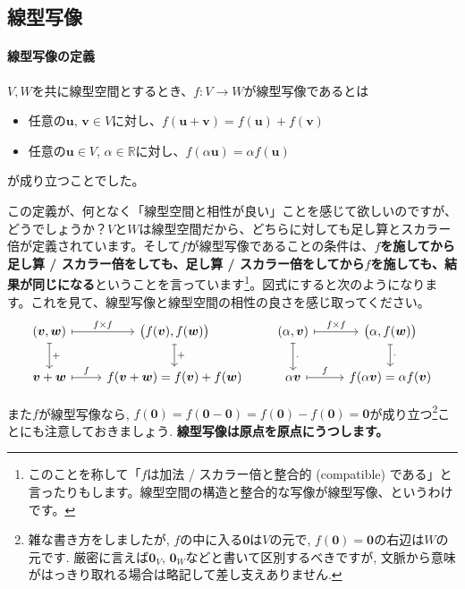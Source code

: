 \subsection{線型写像}

\paragraph{線型写像の定義}

$V, W$を共に線型空間とするとき、$f\colon V\rightarrow W$が線型写像であるとは
\begin{itemize}
\item 任意の$\bm{u}$, $\bm{v}\in V$に対し、$f(\bm{u} + \bm{v}) = f(\bm{u}) + f(\bm{v})$
\item 任意の$\bm{u}\in V$, $\alpha\in\mathbb{R}$に対し、$f(\alpha\bm{u}) = \alpha f(\bm{u})$
\end{itemize}
が成り立つことでした。

この定義が、何となく「線型空間と相性が良い」ことを感じて欲しいのですが、どうでしょうか？$V$と$W$は線型空間だから、どちらに対しても足し算とスカラー倍が定義されています。そして$f$が線型写像であることの条件は、\textbf{$f$を施してから足し算 / スカラー倍をしても、足し算 / スカラー倍をしてから$f$を施しても、結果が同じになる}ということを言っています\footnote{このことを称して「$f$は加法 / スカラー倍と整合的 (compatible) である」と言ったりもします。線型空間の構造と整合的な写像が線型写像、というわけです。}。図式にすると次のようになります。これを見て、線型写像と線型空間の相性の良さを感じ取ってください。
\[
\begin{tikzcd}
(\bm{v},\bm{w}) \arrow[mapsto]{r}{f\times f}  \arrow[mapsto]{d}{+} & \bigl(f(\bm{v}),f(\bm{w})\bigr) \arrow[mapsto]{d}{+} \\
\bm{v}+\bm{w} \arrow[mapsto]{r}{f} & f(\bm{v}+\bm{w})=f(\bm{v})+f(\bm{w})
\end{tikzcd}
\qquad
\begin{tikzcd}
(\alpha,\bm{v}) \arrow[mapsto]{r}{f\times f}  \arrow[mapsto]{d}{\cdot} & \bigl(\alpha,f(\bm{w})\bigr) \arrow[mapsto]{d}{\cdot}\\
\alpha\bm{v} \arrow[mapsto]{r}{f}  & f(\alpha\bm{v})=\alpha f(\bm{v})
\end{tikzcd}
\]

また$f$が線型写像なら, $f(\bm{0})=f(\bm{0}-\bm{0})=f(\bm{0})-f(\bm{0})=\bm{0}$が成り立つ\footnote{雑な書き方をしましたが, $f$の中に入る$\bm{0}$は$V$の元で, $f(\bm{0})=\bm{0}$の右辺は$W$の元です. 厳密に言えば$\bm{0}_V$, $\bm{0}_W$などと書いて区別するべきですが, 文脈から意味がはっきり取れる場合は略記して差し支えありません. }ことにも注意しておきましょう.  \textbf{線型写像は原点を原点にうつします。}

